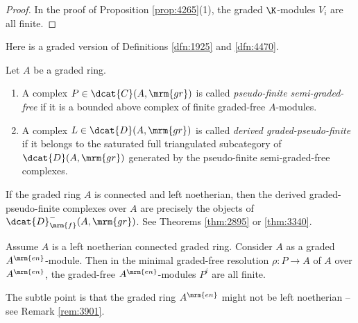 \begin{proof}
In the proof of Proposition \ref{prop:4265}(1), the graded $\K$-modules $V_i$ 
are all finite. 
\end{proof}

Here is a graded version of Definitions \ref{dfn:1925} and \ref{dfn:4470}. 

\begin{dfn} \label{dfn:4532} 
Let $A$ be a graded ring. 
\begin{enumerate}
\item A complex $P \in \dcat{C}(A, \mrm{gr})$
is called {\em pseudo-finite semi-graded-free}%
if it is a bounded above complex of finite graded-free $A$-modules.

\item A complex $L \in \dcat{D}(A, \mrm{gr})$
is called {\em derived graded-pseudo-finite}%
if it belongs to the saturated 
full triangulated subcategory of $\dcat{D}(A, \mrm{gr})$ generated by the 
pseudo-finite semi-graded-free complexes.
\end{enumerate}
\end{dfn}

\begin{exa} \label{exa:4390}
If the graded ring $A$ is connected and left noetherian, then the 
derived graded-pseudo-finite complexes over $A$ are precisely the objects 
of $\dcat{D}^{-}_{\mrm{f}}(A, \mrm{gr})$.
See Theorems \ref{thm:2895} or \ref{thm:3340}. 
\end{exa}

\begin{prop} \label{prop:4266}  
Assume $A$ is a left noetherian connected graded ring.
Consider $A$ as a graded $A^{\mrm{en}}$-module. Then in the minimal graded-free 
resolution $\rho : P \to A$ of $A$ over $A^{\mrm{en}}$, the graded-free 
$A^{\mrm{en}}$-modules $P^i$ are all finite. 
\end{prop}

The subtle point is that the graded ring $A^{\mrm{en}}$ might not be left 
noetherian -- see Remark \ref{rem:3901}. 

